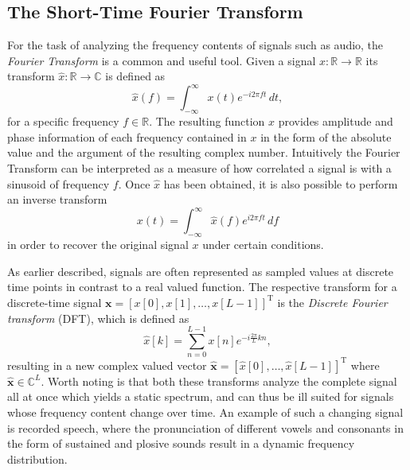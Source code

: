 \documentclass{report}
\begin{document}
\subsection{The Short-Time Fourier Transform} \label{sec:stft}

For the task of analyzing the frequency contents of signals such as audio, the \textit{Fourier Transform} is a common and useful tool. Given a signal $x: \mathbb{R} \to \mathbb{R}$ its transform $\hat{x}: \mathbb{R} \to \mathbb{C}$ is defined as
\begin{equation}
\label{eq:fouriert}
    \hat{x}(f) = \int_{-\infty}^{\infty} x(t) e^{-i 2\pi f t} \, dt,
\end{equation}
for a specific frequency $f\in\mathbb{R}$. The resulting function $\hat{x}$ provides amplitude and phase information of each frequency contained in $x$ in the form of the absolute value and the argument of the resulting complex number. Intuitively the Fourier Transform can be interpreted as a measure of how correlated a signal is with a sinusoid of frequency $f$. Once $\hat{x}$ has been obtained, it is also possible to perform an inverse transform
\begin{equation}
    x(t) = \int_{-\infty}^{\infty} \hat{x}(f) e^{i 2\pi f t} \, df
\end{equation}
in order to recover the original signal $x$ under certain conditions.

As earlier described, signals are often represented as sampled values at discrete time points in contrast to a real valued function. The respective transform for a discrete-time signal $\bm{x}=\left[ x[0], x[1], \dots , x[L-1] \right]^{\text{T}}$ is the \textit{Discrete Fourier transform} (DFT), which is defined as
\begin{equation}
    \hat{x}[k] = \sum_{n=0}^{L-1} x[n] e^{-i \frac{2\pi}{L}k n},
\end{equation}
resulting in a new complex valued vector $\bm{\hat{x}} = [\hat{x}[0],\dots, \hat{x}[L-1]]^{\text{T}}$ where $\bm{\hat{x}}\in \mathbb{C}^{L}$. Worth noting is that both these transforms analyze the complete signal all at once which yields a static spectrum, and can thus be ill suited for signals whose frequency content change over time. An example of such a changing signal is recorded speech, where the pronunciation of different vowels and consonants in the form of sustained and plosive sounds result in a dynamic frequency distribution.
\end{document}
